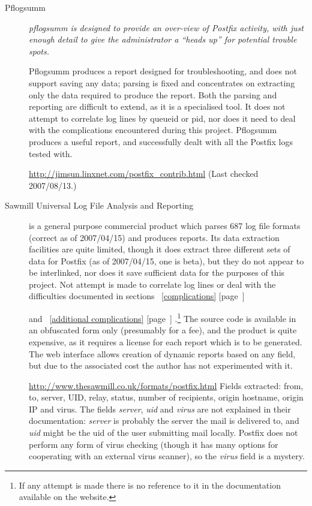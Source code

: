 \documentclass[a4paper,12pt,draft]{article}
\newcommand{\refwithpage}[1]{%
    \empty{}\ref{#1} [page~\pageref{#1}]%
}
\begin{document}
\begin{description}

    \item [Pflogsumm] \textit{pflogsumm is designed to provide an over-view
        of Postfix activity, with just enough detail to give the
        administrator a ``heads up'' for potential trouble spots.\/}

        Pflogsumm produces a report designed for troubleshooting, and does
        not support saving any data; parsing is fixed and concentrates on
        extracting only the data required to produce the report.  Both the
        parsing and reporting are difficult to extend, as it is a
        specialised tool.  It does not attempt to correlate log lines by
        queueid or pid, nor does it need to deal with the complications
        encountered during this project.  Pflogsumm produces a useful
        report, and successfully dealt with all the Postfix logs tested
        with.

        \url{http://jimsun.linxnet.com/postfix_contrib.html} \newline (Last
        checked 2007/08/13.)

    \item [Sawmill Universal Log File Analysis and Reporting] is a general
        purpose commercial product which parses 687 log file formats
        (correct as of 2007/04/15) and produces reports.  Its data
        extraction facilities are quite limited, though it does extract
        three different sets of data for Postfix (as of 2007/04/15, one is
        beta), but they do not appear to be interlinked, nor does it save
        sufficient data for the purposes of this project.  Not attempt is
        made to correlate log lines or deal with the difficulties
        documented in sections~\refwithpage{complications}
        and~\refwithpage{additional complications}.\footnote{If any attempt
        is made there is no reference to it in the documentation available
        on the website.} The source code is available in an obfuscated form
        only (presumably for a fee), and the product is quite expensive, as
        it requires a license for each report which is to be generated.
        The web interface allows creation of dynamic reports based on any
        field, but due to the associated cost the author has not
        experimented with it.

        \url{http://www.thesawmill.co.uk/formats/postfix.html} \newline
        Fields extracted: from, to, server, UID, relay, status, number of
        recipients, origin hostname, origin IP and virus.  The fields
        \textit{server}, \textit{uid\/} and \textit{virus\/} are not
        explained in their documentation: \textit{server\/} is probably the
        server the mail is delivered to, and \textit{uid\/} might be the
        uid of the user submitting mail locally.  Postfix does not perform
        any form of virus checking (though it has many options for
        cooperating with an external virus scanner), so the
        \textit{virus\/} field is a mystery.


\end{description}
\end{document}
